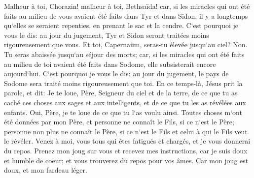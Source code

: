 \verse Malheur à toi, Chorazin! malheur à toi, Bethsaïda! car, si les miracles qui ont été faits au milieu de vous avaient été faits dans Tyr et dans Sidon, il y a longtemps qu`elles se seraient repenties, en prenant le sac et la cendre. 
\verse C`est pourquoi je vous le dis: au jour du jugement, Tyr et Sidon seront traitées moins rigoureusement que vous. 
\verse Et toi, Capernaüm, seras-tu élevée jusqu`au ciel? Non. Tu seras abaissée jusqu`au séjour des morts; car, si les miracles qui ont été faits au milieu de toi avaient été faits dans Sodome, elle subsisterait encore aujourd`hui. 
\verse C`est pourquoi je vous le dis: au jour du jugement, le pays de Sodome sera traité moins rigoureusement que toi. 
\verse En ce temps-là, Jésus prit la parole, et dit: Je te loue, Père, Seigneur du ciel et de la terre, de ce que tu as caché ces choses aux sages et aux intelligents, et de ce que tu les as révélées aux enfants. 
\verse Oui, Père, je te loue de ce que tu l`as voulu ainsi. 
\verse Toutes choses m`ont été données par mon Père, et personne ne connaît le Fils, si ce n`est le Père; personne non plus ne connaît le Père, si ce n`est le Fils et celui à qui le Fils veut le révéler. 
\verse Venez à moi, vous tous qui êtes fatigués et chargés, et je vous donnerai du repos. 
\verse Prenez mon joug sur vous et recevez mes instructions, car je suis doux et humble de coeur; et vous trouverez du repos pour vos âmes. 
\verse Car mon joug est doux, et mon fardeau léger. 

